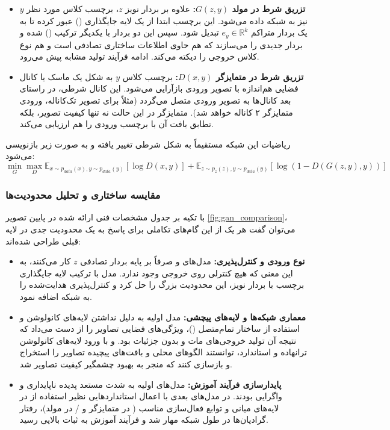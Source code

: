 \documentclass{article}
\begin{document}
\begin{itemize}
	\item \textbf{تزریق شرط در مولد $G(z,y)$:} علاوه بر بردار نویز $z$، برچسب کلاس مورد نظر $y$ نیز به شبکه داده می‌شود. این برچسب ابتدا از یک لایه جایگذاری () عبور کرده تا به یک بردار متراکم $e_y \in \mathbb{R}^k$ تبدیل شود. سپس این دو بردار با یکدیگر ترکیب () شده و بردار جدیدی را می‌سازند که هم حاوی اطلاعات ساختاری تصادفی است و هم نوع کلاس خروجی را دیکته می‌کند. ادامه فرآیند تولید مشابه  پیش می‌رود.
	\item \textbf{تزریق شرط در متمایزگر $D(x,y)$:} برچسب کلاس $y$ به شکل یک ماسک یا کانال فضایی هم‌اندازه با تصویر ورودی بازآرایی می‌شود. این کانال شرطی، در راستای بعد کانال‌ها به تصویر ورودی متصل می‌گردد (مثلاً برای تصویر تک‌کاناله، ورودی متمایزگر ۲ کاناله خواهد شد). متمایزگر در این حالت نه تنها کیفیت تصویر، بلکه تطابق بافت آن با برچسب ورودی را هم ارزیابی می‌کند.
\end{itemize}

ریاضیات این شبکه مستقیماً به شکل شرطی تغییر یافته و به صورت زیر بازنویسی می‌شود:
$$\min_{G} \max_{D} \mathbb{E}_{x \sim p_{data}(x), y \sim p_{data}(y)}[\log D(x, y)] + \mathbb{E}_{z \sim p_z(z), y \sim p_{data}(y)}[\log (1 - D(G(z, y), y))]$$

\subsubsection*{مقایسه ساختاری و تحلیل محدودیت‌ها}
با تکیه بر جدول مشخصات فنی ارائه شده در پایین تصویر \ref{fig:gan_comparison}، می‌توان گفت هر یک از این گام‌های تکاملی برای پاسخ به یک محدودیت جدی در لایه قبلی طراحی شده‌اند:

\begin{itemize}
	\item \textbf{نوع ورودی و کنترل‌پذیری:} مدل‌های  و  صرفاً بر پایه بردار تصادفی $z$ کار می‌کنند، به این معنی که هیچ کنترلی روی خروجی وجود ندارد. مدل  با ترکیب لایه جایگذاری برچسب با بردار نویز، این محدودیت بزرگ را حل کرد و کنترل‌پذیری هدایت‌شده را به شبکه اضافه نمود.
	\item \textbf{معماری شبکه‌ها و لایه‌های پیچشی:} مدل اولیه به دلیل نداشتن لایه‌های کانولوشن و استفاده از ساختار تمام‌متصل ()، ویژگی‌های فضایی تصاویر را از دست می‌داد که نتیجه آن تولید خروجی‌های مات و بدون جزئیات بود.  و  با ورود لایه‌های کانولوشن ترانهاده و استاندارد، توانستند الگوهای محلی و بافت‌های پیچیده تصاویر را استخراج و بازسازی کنند که منجر به بهبود چشمگیر کیفیت تصاویر شد.
	\item \textbf{پایدارسازی فرآیند آموزش:} مدل‌های اولیه  به شدت مستعد پدیده ناپایداری و واگرایی بودند. در مدل‌های بعدی با اعمال استانداردهایی نظیر استفاده از  در لایه‌های میانی و توابع فعال‌سازی مناسب ( در متمایزگر و / در مولد)، رفتار گرادیان‌ها در طول شبکه مهار شد و فرآیند آموزش به ثبات بالایی رسید.
\end{itemize}
\end{document}
